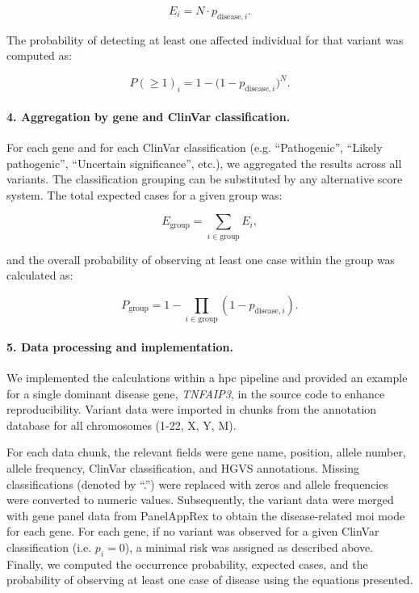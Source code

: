 \[
E_i = N \cdot p_{\text{disease},i}.
\]

The probability of detecting at least one affected individual for that variant was computed as:

\[
P(\geq 1)_i = 1 - \bigl(1 - p_{\text{disease},i}\bigr)^N.
\]

\paragraph{4. Aggregation by gene and ClinVar classification.}
For each gene and for each ClinVar classification (e.g. ``Pathogenic'', ``Likely pathogenic'', ``Uncertain significance'', etc.), we aggregated the results across all variants. The classification grouping can be substituted by any alternative score system. The total expected cases for a given group was:

\[
E_{\text{group}} = \sum_{i \in \text{group}} E_i,
\]

and the overall probability of observing at least one case within the group was calculated as:

\[
P_{\text{group}} = 1 - \prod_{i \in \text{group}} \left(1 - p_{\text{disease},i}\right).
\]

\paragraph{5. Data processing and implementation.}
We implemented the calculations within a \ac{hpc} pipeline and provided an example for a single dominant disease gene, \textit{TNFAIP3}, in the source code to enhance reproducibility. Variant data were imported in chunks from the annotation database for all chromosomes (1-22, X, Y, M). 

For each data chunk, the relevant fields were gene name, position, allele number, allele frequency, ClinVar classification, and HGVS annotations. 
Missing classifications (denoted by ``.'') were replaced with zeros and allele frequencies were converted to numeric values. %
Subsequently, the variant data were merged with gene panel data from PanelAppRex to obtain the disease-related \ac{moi} mode for each gene. 
For each gene, if no variant was observed for a given ClinVar classification (i.e. \(p_i = 0\)), a minimal risk was assigned as described above. 
Finally, we computed the occurrence probability, expected cases, and the probability of observing at least one case of disease using the equations presented.

